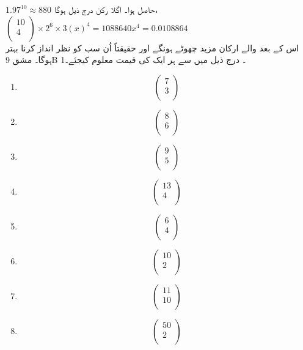 \({1.97}^{10}\approx 880\)
حاصل ہوا۔  اگلا  رکن  درج ذیل ہوگا،
\(\begin{pmatrix}
10\\
4\\
\end{pmatrix}
\times{2}^{6}\times{3({x})}^{4}= 1088640{x}^{4}=0.0108864\)\\
اس کے بعد والے ارکان مزید چھوٹے ہونگے اور حقیقتاً  اُن سب کو نظر انداز کرنا بہتر ہوگا۔ 
مشق
9B
1۔ درج ذیل میں سے ہر ایک  کی  قیمت معلوم  کیجئے۔
\begin{multicols}{2}
 \begin{enumerate}
 \item
 \[\begin{pmatrix}
7\\
3\\
    \end{pmatrix}\]
    \item
\[\begin{pmatrix}
8\\
6\\
\end{pmatrix}\]
    \item
\[\begin{pmatrix}
9\\
5\\
\end{pmatrix}\]
    \item
\[\begin{pmatrix}
13\\
4\\
\end{pmatrix}\]
    \item
\[\begin{pmatrix}
6\\
4\\
\end{pmatrix}\]
    \item
\[\begin{pmatrix}
10\\
2\\
\end{pmatrix}\]
    \item
\[\begin{pmatrix}
11\\
10\\
\end{pmatrix}\]
    \item
\[\begin{pmatrix}
50\\
2\\
\end{pmatrix}\]
\end{enumerate}
\end{multicols}
